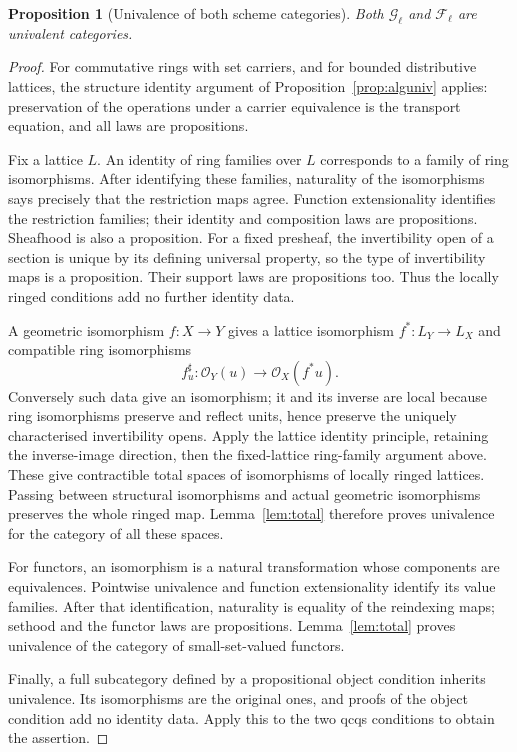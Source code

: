 \documentclass[11pt]{amsart}
\newtheorem{proposition}[theorem]{Proposition}
\theoremstyle{definition}
\theoremstyle{remark}
\begin{document}
\begin{proposition}[Univalence of both scheme categories]
\label{prop:scheme-univalence}
Both $\mathcal G_\ell$ and $\mathcal F_\ell$ are univalent categories.
\end{proposition}
\begin{proof}
For commutative rings with set carriers, and for bounded distributive
lattices, the structure identity argument of
Proposition~\ref{prop:alguniv} applies: preservation of the operations
under a carrier equivalence is the transport equation, and all laws
are propositions.

Fix a lattice $L$. An identity of ring families over $L$ corresponds
to a family of ring isomorphisms. After identifying these families,
naturality of the isomorphisms says precisely that the restriction maps
agree. Function extensionality identifies the restriction families;
their identity and composition laws are propositions. Sheafhood is
also a proposition. For a fixed presheaf, the invertibility open of a
section is unique by its defining universal property, so the type of
invertibility maps is a proposition. Their support laws are
propositions too. Thus the locally ringed conditions add no further
identity data.

A geometric isomorphism $f:X\to Y$ gives a lattice isomorphism
$f^*:L_Y\to L_X$ and compatible ring isomorphisms
\[
 f^\sharp_u:\mathcal O_Y(u)\longrightarrow
                    \mathcal O_X(f^*u).
\]
Conversely such data give an isomorphism; it and its inverse are local
because ring isomorphisms preserve and reflect units, hence preserve
the uniquely characterised invertibility opens. Apply the lattice
identity principle, retaining the inverse-image direction, then the
fixed-lattice ring-family argument above. These give contractible total
spaces of isomorphisms of locally ringed lattices. Passing between
structural isomorphisms and actual geometric isomorphisms preserves the
whole ringed map. Lemma~\ref{lem:total} therefore proves univalence
for the category of all these spaces.

For functors, an isomorphism is a natural transformation whose
components are equivalences. Pointwise univalence and function
extensionality identify its value families. After that identification,
naturality is equality of the reindexing maps; sethood and the functor
laws are propositions. Lemma~\ref{lem:total} proves univalence of the
category of small-set-valued functors.

Finally, a full subcategory defined by a propositional object condition
inherits univalence. Its isomorphisms are the original ones, and proofs
of the object condition add no identity data. Apply this to the two
qcqs conditions to obtain the assertion.
\end{proof}
\end{document}
